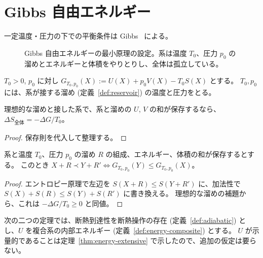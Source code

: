 \section{Gibbs 自由エネルギー}

一定温度・圧力の下での平衡条件は Gibbs~\cite{Gibbs1876} による。

\begin{figure}[htbp]
  \centering
  \caption{Gibbs 自由エネルギーの最小原理の設定。系は温度 $T_0$、圧力 $p_0$ の溜めとエネルギーと体積をやりとりし、全体は孤立している。}
  \label{fig:gibbs}
\end{figure}

\begin{definition}[Gibbs 関数]
  \label{def:gibbs}
  \leanok
  $T_0 > 0$, $p_0$ に対し $G_{T_0, p_0}(X) := U(X) + p_0 V(X) - T_0 S(X)$ とする。
  $T_0, p_0$ には、系が接する溜め (定義~\ref{def:reservoir}) の温度と圧力をとる。
\end{definition}

\begin{lemma}[理想的な溜めの全エントロピー]
  \label{lem:ideal-reservoir}
  \leanok
  理想的な溜めと接した系で、系と溜めの $U$, $V$ の和が保存するなら、$\Delta S_{\text{全体}} = -\Delta G / T_0$。
\end{lemma}

\begin{proof}
  \leanok
  保存則を代入して整理する。
\end{proof}

\begin{theorem}
  \label{thm:gibbs}
  \leanok
  系と温度 $T_0$、圧力 $p_0$ の溜め $R$ の組成、エネルギー、体積の和が保存するとする。
  このとき $X + R \prec Y + R' \iff G_{T_0,p_0}(Y) \le G_{T_0,p_0}(X)$。
\end{theorem}

\begin{proof}
  \leanok
  エントロピー原理で左辺を $S(X + R) \le S(Y + R')$ に、加法性で $S(X) + S(R) \le S(Y) + S(R')$ に書き換える。
  理想的な溜めの補題から、これは $-\Delta G / T_0 \ge 0$ と同値。
\end{proof}

次の二つの定理では、断熱到達性を断熱操作の存在 (定義~\ref{def:adiabatic}) とし、$U$ を複合系の内部エネルギー (定義~\ref{def:energy-composite}) とする。
$U$ が示量的であることは定理~\ref{thm:energy-extensive} で示したので、追加の仮定は要らない。

